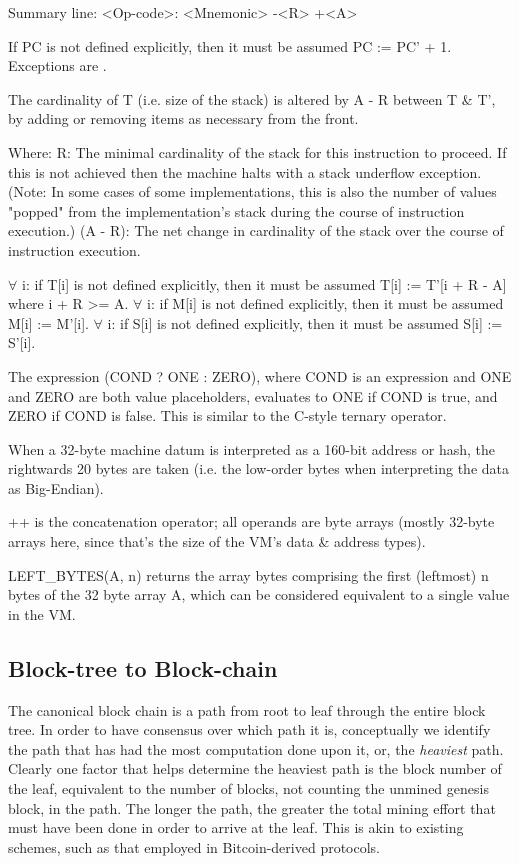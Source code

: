 \documentclass[9pt,oneside]{amsart}
\begin{document}
\begin{multicols}{2}
Summary line:
<Op-code>: <Mnemonic> -<R> +<A>

If PC is not defined explicitly, then it must be assumed PC := PC' + 1. Exceptions are .

The cardinality of T (i.e. size of the stack) is altered by A - R between T \& T', by adding or removing items as necessary from the front.

Where:
R: The minimal cardinality of the stack for this instruction to proceed. If this is not achieved then the machine halts with a stack underflow exception. (Note: In some cases of some implementations, this is also the number of values "popped" from the implementation's stack during the course of instruction execution.)
(A - R): The net change in cardinality of the stack over the course of instruction execution.

$\forall$ i: if T[i] is not defined explicitly, then it must be assumed T[i] := T'[i + R - A] where i + R >= A.
$\forall$ i: if M[i] is not defined explicitly, then it must be assumed M[i] := M'[i].
$\forall$ i: if S[i] is not defined explicitly, then it must be assumed S[i] := S'[i].

The expression (COND ? ONE : ZERO), where COND is an expression and ONE and ZERO are both value placeholders, evaluates to ONE if COND is true, and ZERO if COND is false. This is similar to the C-style ternary operator.

When a 32-byte machine datum is interpreted as a 160-bit address or hash, the rightwards 20 bytes are taken (i.e. the low-order bytes when interpreting the data as Big-Endian).

++ is the concatenation operator; all operands are byte arrays (mostly 32-byte arrays here, since that's the size of the VM's data \& address types).

LEFT\_BYTES(A, n) returns the array bytes comprising the first (leftmost) n bytes of the 32 byte array A, which can be considered equivalent to a single value in the VM.



\subsection{Block-tree to Block-chain} \label{ch:ghost}

The canonical block chain is a path from root to leaf through the entire block tree. In order to have consensus over which path it is, conceptually we identify the path that has had the most computation done upon it, or, the \textit{heaviest} path. Clearly one factor that helps determine the heaviest path is the block number of the leaf, equivalent to the number of blocks, not counting the unmined genesis block, in the path. The longer the path, the greater the total mining effort that must have been done in order to arrive at the leaf. This is akin to existing schemes, such as that employed in Bitcoin-derived protocols.


\end{multicols}
\end{document}
